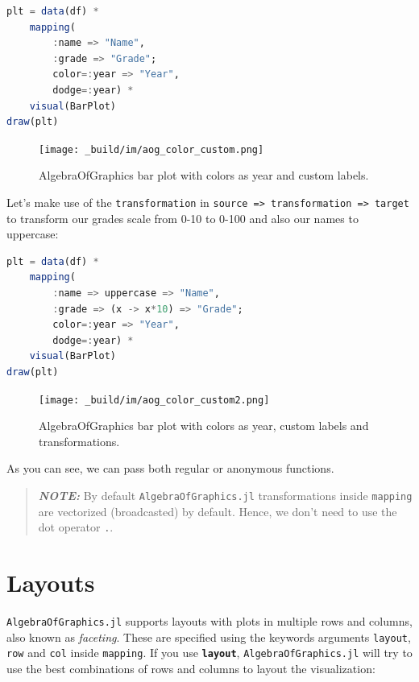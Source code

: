 \documentclass[
  notoc %
]{tufte-book}
\newcommand{\passthrough}[1]{#1}
\begin{document}
\begin{lstlisting}[language=Julia]
plt = data(df) *
    mapping(
        :name => "Name",
        :grade => "Grade";
        color=:year => "Year",
        dodge=:year) *
    visual(BarPlot)
draw(plt)
\end{lstlisting}

\begin{figure}
\hypertarget{fig:aog_color_custom}{%
\centering
\texttt{[image: \_build/im/aog\_color\_custom.png]}
\caption{AlgebraOfGraphics bar plot with colors as year and custom
labels.}\label{fig:aog_color_custom}
}
\end{figure}

Let's make use of the \passthrough{\lstinline!transformation!} in
\passthrough{\lstinline!source => transformation => target!} to
transform our grades scale from 0-10 to 0-100 and also our names to
uppercase:

\begin{lstlisting}[language=Julia]
plt = data(df) *
    mapping(
        :name => uppercase => "Name",
        :grade => (x -> x*10) => "Grade";
        color=:year => "Year",
        dodge=:year) *
    visual(BarPlot)
draw(plt)
\end{lstlisting}

\begin{figure}
\hypertarget{fig:aog_color_custom2}{%
\centering
\texttt{[image: \_build/im/aog\_color\_custom2.png]}
\caption{AlgebraOfGraphics bar plot with colors as year, custom labels
and transformations.}\label{fig:aog_color_custom2}
}
\end{figure}

As you can see, we can pass both regular or anonymous functions.

\begin{quote}
\textbf{\emph{NOTE:}} By default
\passthrough{\lstinline!AlgebraOfGraphics.jl!} transformations inside
\passthrough{\lstinline!mapping!} are vectorized (broadcasted) by
default. Hence, we don't need to use the dot operator
\passthrough{\lstinline!.!}.
\end{quote}

\hypertarget{sec:aog_layouts}{%
\section{Layouts}\label{sec:aog_layouts}}

\passthrough{\lstinline!AlgebraOfGraphics.jl!} supports layouts with
plots in multiple rows and columns, also known as \emph{faceting}. These
are specified using the keywords arguments
\passthrough{\lstinline!layout!}, \passthrough{\lstinline!row!} and
\passthrough{\lstinline!col!} inside \passthrough{\lstinline!mapping!}.
If you use \textbf{\passthrough{\lstinline!layout!}},
\passthrough{\lstinline!AlgebraOfGraphics.jl!} will try to use the best
combinations of rows and columns to layout the visualization:
\end{document}
